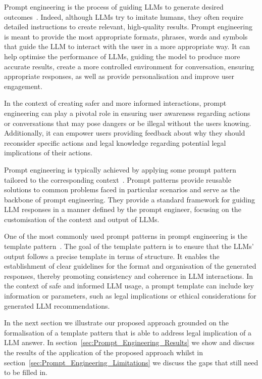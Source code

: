 \documentclass[sn-mathphys-num]{sn-jnl}%
\begin{document}
Prompt engineering is the process of guiding LLMs to generate desired outcomes~\cite{liu2024jailbreaking}. Indeed, although LLMs try to imitate humans, they often require detailed instructions to create relevant, high-quality results. Prompt engineering is meant to provide the most appropriate formats, phrases, words and symbols that guide the LLM to interact with the user in a more appropriate way. It can help optimise the performance of LLMs, guiding the model to produce more accurate results, create a more controlled environment for conversation, ensuring appropriate responses, as well as provide personalisation and improve user engagement.

In the context of creating safer and more informed interactions, prompt engineering can play a pivotal role in ensuring user awareness regarding actions or conversations that may pose dangers or be illegal  without the users knowing.  
Additionally, it can empower users providing feedback about why they should reconsider specific actions and legal knowledge regarding potential legal implications of their actions.

Prompt engineering is typically achieved by applying some prompt pattern tailored to the corresponding context~\cite{wang2023prompt,white2023prompt}.
Prompt patterns provide reusable solutions to common problems faced in particular scenarios and serve as the backbone of prompt engineering. 
They provide a standard framework for guiding LLM responses in a manner defined by the prompt engineer, focusing on the customisation of the context and output of LLMs.  

One of the most commonly used prompt patterns in prompt engineering is the template pattern~\cite{white2023prompt}. 
The goal of the template pattern is to ensure that the LLMs' output follows a precise template in terms of structure. 
It enables the establishment of clear guidelines for the format and organisation of the generated responses, thereby promoting consistency and coherence in LLM interactions.
In the context of safe and informed LLM usage, a prompt template can include key information or parameters, such as legal implications or ethical considerations for generated LLM recommendations. 

In the next section we illustrate our proposed approach grounded on the formalisation of a template pattern that is able to address legal implication of a LLM answer. In section~\ref{sec:Prompt_Engineering_Results} we show and discuss the results of the application of the proposed approach whilst in section~\ref{sec:Prompt_Engineering_Limitations} we discuss the gaps that still need to be filled in.
\end{document}
